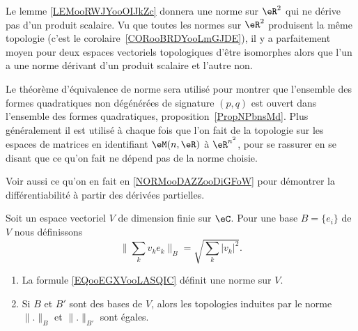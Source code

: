 \begin{normaltext}      \label{NORMooNKBCooKziIjx}
    Le lemme \ref{LEMooRWJYooOIJkZc} donnera une norme sur \( \eR^2\) qui ne dérive pas d'un produit scalaire. Vu que toutes les normes sur \( \eR^2\) produisent la même topologie (c'est le corolaire~\ref{CORooBRDYooLmGJDE}), il y a parfaitement moyen pour deux espaces vectoriels topologiques d'être isomorphes alors que l'un a une norme dérivant d'un produit scalaire et l'autre non.
\end{normaltext}

\begin{normaltext}
    Le théorème d'équivalence de norme sera utilisé pour montrer que l'ensemble des formes quadratiques non dégénérées de signature \( (p,q)\) est ouvert dans l'ensemble des formes quadratiques, proposition~\ref{PropNPbnsMd}. Plus généralement il est utilisé à chaque fois que l'on fait de la topologie sur les espaces de matrices en identifiant \( \eM(n,\eR)\) à \( \eR^{n^2}\), pour se rassurer en se disant que ce qu'on fait ne dépend pas de la norme choisie.

    Voir aussi ce qu'on en fait en \ref{NORMooDAZZooDiGFoW} pour démontrer la différentiabilité à partir des dérivées partielles.
\end{normaltext}

\begin{proposition} \label{PROPooNTCFooEcwZwt}
    Soit un espace vectoriel \( V\) de dimension finie sur \( \eC\). Pour une base \( B= \{ e_i \}\) de \( V\) nous définissons
    \begin{equation}        \label{EQooEGXVooLASQIC}
        \| \sum_kv_ke_k \|_B= \sqrt{ \sum_k| v_k |^2 }.
    \end{equation}
    \begin{enumerate}
        \item
            La formule \eqref{EQooEGXVooLASQIC} définit une norme sur \( V\).
        \item
            Si \( B\) et \( B'\) sont des bases de \( V\), alors les topologies induites par le norme \( \| . \|_B\) et \( \| . \|_{B'}\) sont égales.
    \end{enumerate}
\end{proposition}

